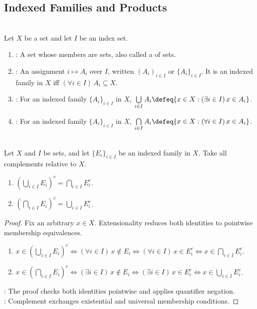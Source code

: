 \subsection{Indexed Families and Products}

\begin{definition} \label{def:indexed-families-unions-intersections} \\
Let $X$ be a set and let $I$ be an index set.
\begin{enumerate}[label=(\roman*)]
\setlength{\itemsep}{0pt}
\item {}: A set whose members are sets, also called a  of sets.
\item {}: An assignment $i\mapsto A_i$ over $I$, written $(A_i)_{i\in I}$ or $\{A_i\}_{i\in I}$.
It is an indexed family in $X$ iff $(\forall i\in I)\,A_i\subseteq X$.
\item {}: For an indexed family $\{A_i\}_{i\in I}$ in $X$, $\bigcup\limits_{i\in I}A_i\defeq\{x\in X:(\exists i\in I)\,x\in A_i\}$.
\item {}: For an indexed family $\{A_i\}_{i\in I}$ in $X$, $\bigcap\limits_{i\in I}A_i\defeq\{x\in X:(\forall i\in I)\,x\in A_i\}$.
\end{enumerate}
\end{definition}

\begin{theorem} \label{thm:indexed-de-morgan-laws} \\
Let $X$ and $I$ be sets, and let $\{E_i\}_{i\in I}$ be an indexed family in $X$.
Take all complements relative to $X$.
\begin{enumerate}[label=(\roman*)]
\setlength{\itemsep}{0pt}
\item $\left(\bigcup\limits_{i\in I}E_i\right)^c=\bigcap\limits_{i\in I}E_i^c$.
\item $\left(\bigcap\limits_{i\in I}E_i\right)^c=\bigcup\limits_{i\in I}E_i^c$.
\end{enumerate}
\begin{proof}
Fix an arbitrary $x\in X$.
Extensionality reduces both identities to pointwise membership equivalences.
\begin{enumerate}[label=(\roman*)]
\setlength{\itemsep}{0pt}
\item $x\in\left(\bigcup\limits_{i\in I}E_i\right)^c\iff(\forall i\in I)\,x\notin E_i\iff(\forall i\in I)\,x\in E_i^c\iff x\in\bigcap\limits_{i\in I}E_i^c$.
\item $x\in\left(\bigcap\limits_{i\in I}E_i\right)^c\iff(\exists i\in I)\,x\notin E_i\iff(\exists i\in I)\,x\in E_i^c\iff x\in\bigcup\limits_{i\in I}E_i^c$.
\end{enumerate}
: The proof checks both identities pointwise and applies quantifier negation.\\
: Complement exchanges existential and universal membership conditions.
\end{proof}
\end{theorem}

